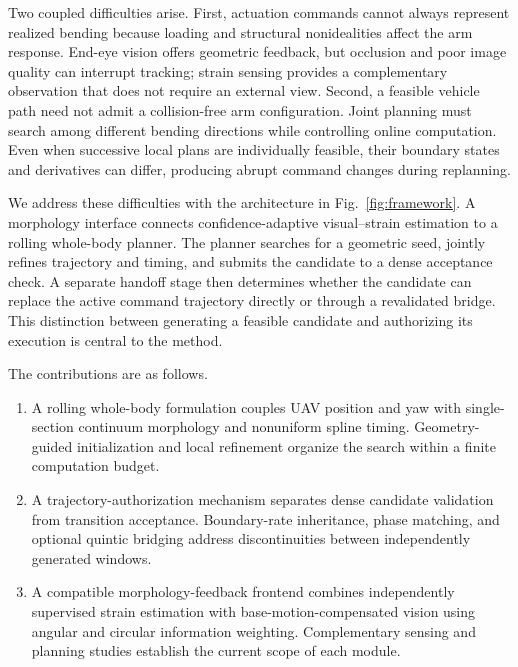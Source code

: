 \documentclass[journal,twoside]{IEEEtran}
\begin{document}
Two coupled difficulties arise. First, actuation commands cannot always represent realized bending because loading and structural nonidealities affect the arm response. End-eye vision offers geometric feedback, but occlusion and poor image quality can interrupt tracking; strain sensing provides a complementary observation that does not require an external view. Second, a feasible vehicle path need not admit a collision-free arm configuration. Joint planning must search among different bending directions while controlling online computation. Even when successive local plans are individually feasible, their boundary states and derivatives can differ, producing abrupt command changes during replanning.

We address these difficulties with the architecture in Fig.~\ref{fig:framework}. A morphology interface connects confidence-adaptive visual--strain estimation to a rolling whole-body planner. The planner searches for a geometric seed, jointly refines trajectory and timing, and submits the candidate to a dense acceptance check. A separate handoff stage then determines whether the candidate can replace the active command trajectory directly or through a revalidated bridge. This distinction between generating a feasible candidate and authorizing its execution is central to the method.

The contributions are as follows.
\begin{enumerate}
\item A rolling whole-body formulation couples UAV position and yaw with single-section continuum morphology and nonuniform spline timing. Geometry-guided initialization and local refinement organize the search within a finite computation budget.
\item A trajectory-authorization mechanism separates dense candidate validation from transition acceptance. Boundary-rate inheritance, phase matching, and optional quintic bridging address discontinuities between independently generated windows.
\item A compatible morphology-feedback frontend combines independently supervised strain estimation with base-motion-compensated vision using angular and circular information weighting. Complementary sensing and planning studies establish the current scope of each module.
\end{enumerate}
\end{document}
